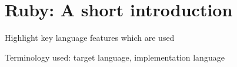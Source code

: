\section{Ruby: A short introduction}

Highlight key language features which are used

Terminology used: target language, implementation language
